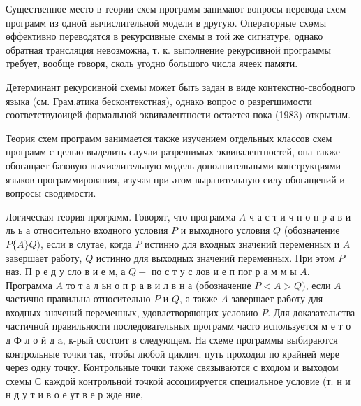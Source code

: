 \documentclass[10pt]{article}
\begin{document}
Существенное место в теории схем программ занимают вопросы перевода схем программ из одной вычислительной модели в другую. Операторные схөмы өффективно переводятся в рекурсивные схемы в той же сигнатуре, однако обратная трансляция невозможна, т. к. выполнение рекурсивной программы требует, вообще говоря, сколь угодно большого числа ячеек памяти.



Детерминант рекурсивной схемы может быть задан в виде контекстно-свободного языка (см. Грам.атика бесконтекстная), однако вопрос о разрегшимости соответствуюицей формальной эквивалентности остается пока (1983) открытым.



Теория схем программ занимается также изучением отдельных классов схем программ с целью выделить случаи разрешимых эквивалентностей, она также обогащает базовую вычислительную модель дополнительными конструкциями языков программирования, изучая при әтом выразительную силу обогащений и вопросы сводимости.



Логическая теория программ. Говорят, что программа $A$ ч а с т и ч н о п р а в и ль ь а относительно входного условия $P$ и выходного условия $Q$ (обозначение $P\{A\} Q)$, если в слутае, когда $P$ истинно для входных значений переменных и $A$ завершает работу, $Q$ истинно для выходных значений переменных. При этом $P$ наз. П р е д у сло в и е м, а $Q-$ по с т у с лов и е п пог р а м м ы $A$. Программа $A$ то т а л ьн о п р а в и л в н а (обозначение $P<A>Q)$, если $A$ частично правильна относительно $P$ и $Q$, а также $A$ завершает работу для входных значений переменных, удовлетворяющих условию $P$. Для доказательства частичной правильности последовательных программ часто используется м е т о д Ф л о й д $\mathrm{a}$, к-рый состоит в следующем. На схеме программы выбираются контрольные точки так, чтобы любой циклич. путь проходил по крайней мере через одну точку. Контрольные точки также связываются с входом и выходом схемы С каждой контрольной точкой ассоциируется специальное условие (т. н и н д у т и в о е ут в е р жде ние,
\end{document}
